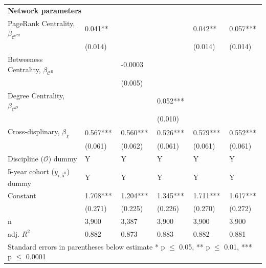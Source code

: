 \documentclass[10pt]{article}          %
\begin{document}
\begin{table}[h]
\begin{tabular}{m{5cm} p{2.1cm} p{2.1cm} p{2.1cm} p{2.1cm} p{2.1cm} }
\multicolumn{6}{l}{\textbf{Network parameters}} \\
\rowcolor{lightgray}
{PageRank Centrality, $\beta_{\mathscr{C}^{PR}}$}     & 0.041** &  &              & 0.042**   & 0.057***  \\ 
                                              & (0.014) &  &              & (0.014)   & (0.014)   \\
\rowcolor{lightgray}
{Betweeness Centrality, $\beta_{\mathscr{C}^B}$}    &  & -0.0003 &  &  &  \\ 
                                              &  & (0.005) & & & \\
\rowcolor{lightgray}
{Degree Centrality, $\beta_{\mathscr{C}^D}$}        &  &  & 0.052*** & & \\ 
                                              &  &  & (0.010) & & \\
\rowcolor{lightgray}
{Cross-displinary, $\beta_{\chi}$}          & 0.567***  & 0.560***  & 0.526***  & 0.579***  & 0.552***  \\
                                            & (0.061)   & (0.062)   & (0.061)   & (0.061)   & (0.061) \\ \hline

\rowcolor{lightgray}
{Discipline ($\mathscr{O}$) dummy}                & Y & Y & Y & Y & Y  \\
\rowcolor{lightgray}
{5-year cohort ($y_{i,5^0}$) dummy}   & Y & Y & Y & Y & Y \\
\rowcolor{lightgray}
{Constant}                            & 1.708***  & 1.204***  & 1.345***  & 1.711***  & 1.617***  \\ 
                                      & (0.271)   & (0.225)   & (0.226)   & (0.270)   & (0.272)   \\ \hline

\rowcolor{lightgray}
{n}                                   & 3,900 & 3,387 & 3,900 & 3,900 & 3,900 \\
\rowcolor{lightgray}
{adj. $R^2$}                          & 0.882 & 0.873 & 0.883 & 0.882 & 0.881 \\ \hline \hline
\multicolumn{6}{l}{\footnotesize{Standard errors in parentheses below estimate * p $\leq$ 0.05, ** p $\leq$ 0.01, *** p $\leq$ 0.0001}}

\end{tabular}
\label{tbl:sT3}
\end{table}

\bigskip   %
\end{document}
